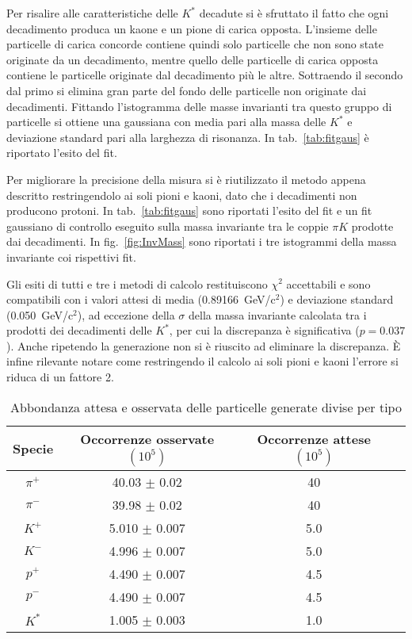 \documentclass[a4paper,10pt]{article}
\begin{document}
Per risalire alle caratteristiche delle $K^*$ decadute si è sfruttato il fatto che ogni decadimento produca un kaone e un pione di carica opposta. L'insieme delle particelle di carica concorde contiene quindi solo particelle che non sono state originate da un decadimento, mentre quello delle particelle di carica opposta contiene le particelle originate dal decadimento più le altre. Sottraendo il secondo dal primo si elimina gran parte del fondo delle particelle non originate dai decadimenti. Fittando l'istogramma delle masse invarianti tra questo gruppo di particelle si ottiene una gaussiana con media pari alla massa delle $K^*$ e deviazione standard pari alla larghezza di risonanza. In tab.~\ref{tab:fitgaus} è riportato l'esito del fit.

Per migliorare la precisione della misura si è riutilizzato il metodo appena descritto restringendolo ai soli pioni e kaoni, dato che i decadimenti non producono protoni. In tab.~\ref*{tab:fitgaus} sono riportati l'esito del fit e un fit gaussiano di controllo eseguito sulla massa invariante tra le coppie $\pi K$ prodotte dai decadimenti. In fig.~\ref*{fig:InvMass} sono riportati i tre istogrammi della massa invariante coi rispettivi fit.

Gli esiti di tutti e tre i metodi di calcolo restituiscono $\chi^2$ accettabili e sono compatibili con i valori attesi di media (0.89166~GeV/c$^2$) e deviazione standard (0.050~GeV/c$^2$), ad eccezione della $\sigma$ della massa invariante calcolata tra i prodotti dei decadimenti delle $K^*$, per cui la discrepanza è significativa ($p = 0.037$). Anche ripetendo la generazione non si è riuscito ad eliminare la discrepanza. È infine rilevante notare come restringendo il calcolo ai soli pioni e kaoni l'errore si riduca di un fattore 2.

\begin{table}
  \caption{Abbondanza attesa e osservata delle particelle generate divise per tipo}
  \label{tab:abbondanza}
  \centering
  \begin{tabular}{cccc}
    \toprule
    Specie  & Occorrenze osservate $(10^5)$ & Occorrenze attese $(10^5)$ \\
    \midrule
    $\pi^+$ & 40.03 $\pm$ 0.02              & 40                         \\
    $\pi^-$ & 39.98 $\pm$ 0.02              & 40                         \\
    $K^+$   & 5.010 $\pm$ 0.007             & 5.0                        \\
    $K^-$   & 4.996 $\pm$ 0.007             & 5.0                        \\
    $p^+$   & 4.490 $\pm$ 0.007             & 4.5                        \\
    $p^-$   & 4.490 $\pm$ 0.007             & 4.5                        \\
    $K^*$   & 1.005 $\pm$ 0.003             & 1.0                        \\
    \bottomrule
  \end{tabular}
\end{table}
\end{document}
